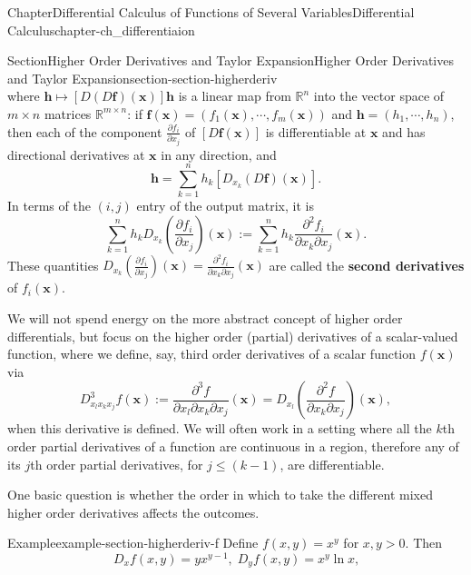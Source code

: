 \documentclass[oneside,10pt,]{book}
\newcommand{\terminology}[1]{\textbf{#1}}
\numberwithin{equation}{section}
\newcommand{\bff}{\mathbf{f}}
\newcommand{\bh}{\mathbf{h}}
\newcommand{\bx}{\mathbf{x}}
\newcommand{\bbR}{\mathbb{R}}
\newcommand{\gt}{>}
\begin{document}
\begin{chapterptx}{Chapter}{Differential Calculus of Functions of Several Variables}{}{Differential Calculus}{}{}{chapter-ch_differentiaion}
\begin{sectionptx}{Section}{Higher Order Derivatives and Taylor Expansion}{}{Higher Order Derivatives and Taylor Expansion}{}{}{section-section-higherderiv}
\begin{equation*}
\end{equation*}
where \(\bh \mapsto [D\left(D\bff\right) (\bx)]\bh\) is a linear map from \(\bbR^{n}\) into the  vector space of \(m\times n\) matrices \(\bbR^{m\times n}\): if \(\bff(\bx)=(f_{1}(\bx),\cdots, f_{m}(\bx))\) and \(\bh=(h_{1},\cdots, h_{n})\), then each of the component \(\frac{\partial f_{i}}{\partial x_{j}}\) of \([D\bff (\bx)]\) is differentiable at \(\bx\) and has directional derivatives at \(\bx\) in any direction, and%
\begin{equation*}
[D\left(D\bff\right) (\bx)]\bh= \sum_{k=1}^{n} h_{k}[ D_{x_{k}}\left(D\bff\right) (\bx)].
\end{equation*}
In terms of the \((i, j)\) entry of the output matrix, it is%
\begin{equation*}
\sum_{k=1}^{n} h_{k}D_{x_{k}}\left( \frac{\partial f_{i}}{\partial x_{j}}\right) (\bx)
:=  \sum_{k=1}^{n} h_{k} \frac{\partial^{2} f_{i}}{\partial x_{k}\partial x_{j}} (\bx)\text{.}
\end{equation*}
These quantities \(D_{x_{k}}\left( \frac{\partial f_{i}}{\partial x_{j}}\right) (\bx)
= \frac{\partial^{2} f_{i}}{\partial x_{k}\partial x_{j}} (\bx)\) are called the \terminology{second derivatives} of \(f_{i}(\bx)\).%
\par
We will not spend energy on the more abstract concept of higher order differentials,  but focus on the higher order (partial) derivatives of a scalar-valued function, where we define, say,  third order derivatives of a scalar function \(f(\bx)\) via%
\begin{equation*}
D^{3}_{x_{l}x_{k}x_{j}} f(\bx):=
\frac{\partial^{3} f}{\partial x_{l} \partial x_{k}\partial x_{j}} (\bx)=
D_{x_{l}}\left( \frac{\partial^{2} f}{\partial x_{k}\partial x_{j}}  \right)(\bx),
\end{equation*}
when this derivative is defined.  We will often work in a setting where all the \(k\)th order partial derivatives of a function are continuous in a region, therefore any of its \(j\)th order partial derivatives, for \(j\le (k-1)\), are differentiable.%
\par
One basic question is whether the order in which to take the different mixed higher order derivatives affects the outcomes.%
\begin{example}{Example}{}{example-section-higherderiv-f}%
Define \(f(x, y)=x^{y}\) for \(x, y \gt 0\). Then%
\begin{equation*}
D_{x} f(x, y)= y x^{y-1}, \; D_{y}f(x, y)=x^{y} \ln x\text{,}
\end{equation*}

\end{example}
\end{sectionptx}
\end{chapterptx}
\end{document}
